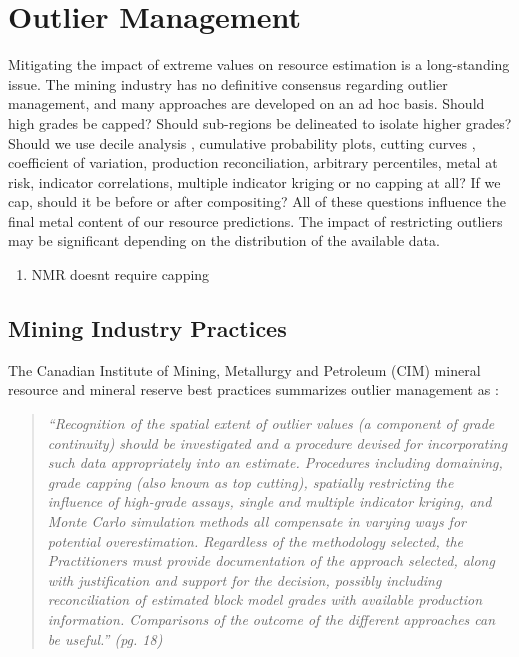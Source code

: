 
\chapter{Outlier Management}
\label{ch:02outlier}

Mitigating the impact of extreme values on resource estimation is a long-standing issue. The mining industry has no definitive consensus regarding outlier management, and many approaches are developed on an ad hoc basis. Should high grades be capped? Should sub-regions be delineated to isolate higher grades? Should we use decile analysis \citep{parrish1997geologist}, cumulative probability plots, cutting curves \citep{roscoe1996cutting}, coefficient of variation, production reconciliation, arbitrary percentiles, metal at risk, indicator correlations, multiple indicator kriging or no capping at all? If we cap, should it be before or after compositing? All of these questions influence the final metal content of our resource predictions. The impact of restricting outliers may be significant depending on the distribution of the available data.

\begin{enumerate}
    \item NMR doesnt require capping
\end{enumerate}

\FloatBarrier
\section{Mining Industry Practices}
\label{sec:02industry}

The Canadian Institute of Mining, Metallurgy and Petroleum (CIM) mineral resource and mineral reserve best practices summarizes outlier management as \citep{cim2019}:

\blockquote{\textit{``Recognition of the spatial extent of outlier values (a component of grade continuity) should be investigated and a procedure devised for incorporating such data appropriately into an estimate. Procedures including domaining, grade capping (also known as top cutting), spatially restricting the influence of high-grade assays, single and multiple indicator kriging, and Monte Carlo simulation methods all compensate in varying ways for potential overestimation. Regardless of the methodology selected, the Practitioners must provide documentation of the approach selected, along with justification and support for the decision, possibly including reconciliation of estimated block model grades with available production information. Comparisons of the outcome of the different approaches can be useful.'' (pg. 18)}}

